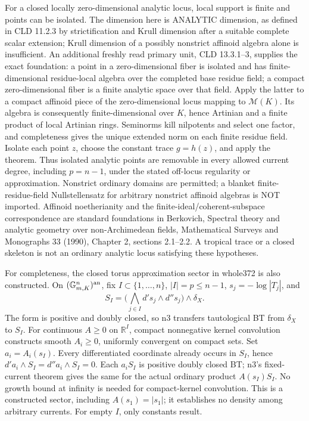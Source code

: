 \documentclass[11pt]{article}
\begin{document}
For a closed locally zero-dimensional analytic locus, local support is finite and points can be isolated. The dimension here is ANALYTIC dimension, as defined in CLD 11.2.3 by strictification and Krull dimension after a suitable complete scalar extension; Krull dimension of a possibly nonstrict affinoid algebra alone is insufficient. An additional freshly read primary unit, CLD 13.3.1--3, supplies the exact foundation: a point in a zero-dimensional fiber is isolated and has finite-dimensional residue-local algebra over the completed base residue field; a compact zero-dimensional fiber is a finite analytic space over that field. Apply the latter to a compact affinoid piece of the zero-dimensional locus mapping to \(\mathcal M(K)\). Its algebra is consequently finite-dimensional over \(K\), hence Artinian and a finite product of local Artinian rings. Seminorms kill nilpotents and select one factor, and completeness gives the unique extended norm on each finite residue field. Isolate each point \(z\), choose the constant trace \(g=h(z)\), and apply the theorem. Thus isolated analytic points are removable in every allowed current degree, including \(p=n-1\), under the stated off-locus regularity or approximation. Nonstrict ordinary domains are permitted; a blanket finite-residue-field Nullstellensatz for arbitrary nonstrict affinoid algebras is NOT imported. Affinoid noetherianity and the finite-ideal/coherent-subspace correspondence are standard foundations in Berkovich, Spectral theory and analytic geometry over non-Archimedean fields, Mathematical Surveys and Monographs 33 (1990), Chapter 2, sections 2.1--2.2. A tropical trace or a closed skeleton is not an ordinary analytic locus satisfying these hypotheses.

For completeness, the closed torus approximation sector in whole372 is also constructed. On \((\mathbb G_{m,K}^n)^{\rm an}\), fix \(I\subset\{1,\ldots,n\}\), \(|I|=p\leq n-1\), \(s_j=-\log|T_j|\), and
\[
 S_I=\big(\bigwedge_{j\in I}d's_j\wedge d''s_j\big)\wedge\delta_X.
\]
The form is positive and doubly closed, so n3 transfers tautological BT from \(\delta_X\) to \(S_I\). For continuous \(A\geq0\) on \(\mathbb R^I\), compact nonnegative kernel convolution constructs smooth \(A_i\geq0\), uniformly convergent on compact sets. Set \(a_i=A_i(s_I)\). Every differentiated coordinate already occurs in \(S_I\), hence \(d'a_i\wedge S_I=d''a_i\wedge S_I=0\). Each \(a_iS_I\) is positive doubly closed BT; n3's fixed-current theorem gives the same for the actual ordinary product \(A(s_I)S_I\). No growth bound at infinity is needed for compact-kernel convolution. This is a constructed sector, including \(A(s_1)=|s_1|\); it establishes no density among arbitrary currents. For empty \(I\), only constants result.
\end{document}

